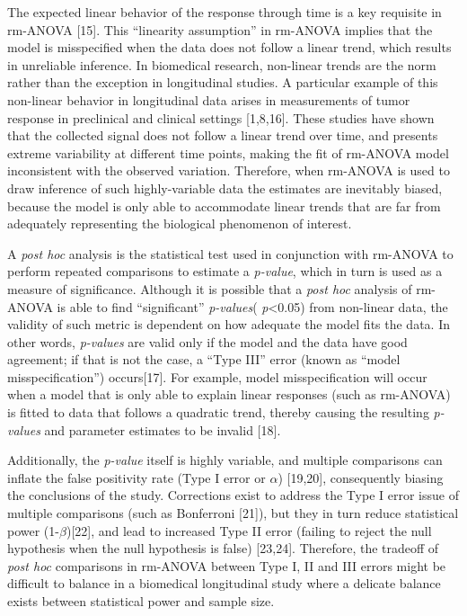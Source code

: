 \documentclass[
]{article}
\begin{document}
The expected linear behavior of the response through time is a key requisite in rm-ANOVA {[}15{]}. This ``linearity assumption'' in rm-ANOVA implies that the model is misspecified when the data does not follow a linear trend, which results in unreliable inference. In biomedical research, non-linear trends are the norm rather than the exception in longitudinal studies. A particular example of this non-linear behavior in longitudinal data arises in measurements of tumor response in preclinical and clinical settings {[}1,8,16{]}. These studies have shown that the collected signal does not follow a linear trend over time, and presents extreme variability at different time points, making the fit of rm-ANOVA model inconsistent with the observed variation. Therefore, when rm-ANOVA is used to draw inference of such highly-variable data the estimates are inevitably biased, because the model is only able to accommodate linear trends that are far from adequately representing the biological phenomenon of interest.

A \emph{post hoc} analysis is the statistical test used in conjunction with rm-ANOVA to perform repeated comparisons to estimate a \emph{p-value}, which in turn is used as a measure of significance.
Although it is possible that a \emph{post hoc} analysis of rm-ANOVA is able to find ``significant'' \emph{p-values}( \emph{p}\textless0.05) from non-linear data, the validity of such metric is dependent on how adequate the model fits the data. In other words, \emph{p-values} are valid only if the model and the data have good agreement; if that is not the case, a ``Type III'' error (known as ``model misspecification'') occurs{[}17{]}. For example, model misspecification will occur when a model that is only able to explain linear responses (such as rm-ANOVA) is fitted to data that follows a quadratic trend, thereby causing the resulting \emph{p-values} and parameter estimates to be invalid {[}18{]}.

Additionally, the \emph{p-value} itself is highly variable, and multiple comparisons can inflate the false positivity rate (Type I error or \(\alpha\)) {[}19,20{]}, consequently biasing the conclusions of the study. Corrections exist to address the Type I error issue of multiple comparisons (such as Bonferroni {[}21{]}), but they in turn reduce statistical power (1-\(\beta\)){[}22{]}, and lead to increased Type II error (failing to reject the null hypothesis when the null hypothesis is false) {[}23,24{]}. Therefore, the tradeoff of \emph{post hoc} comparisons in rm-ANOVA between Type I, II and III errors might be difficult to balance in a biomedical longitudinal study where a delicate balance exists between statistical power and sample size.
\end{document}
